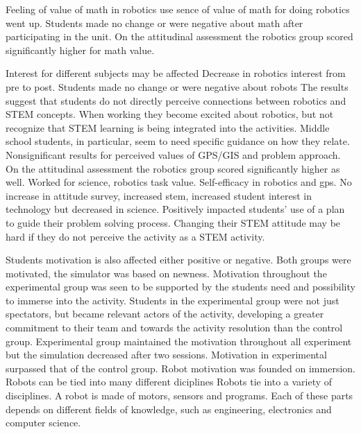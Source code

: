 \bigskip\noindent
Feeling of value of math in robotics use
\cite{silk2011resources} sence of value of math for doing robotics went up. 
\cite{silk2011resources}Students made no change or were negative about math after participating in the unit. 
\cite{nugent2009use} On the attitudinal assessment the robotics group scored significantly higher for math value.

\bigskip\noindent
Interest for different subjects may be affected
\cite{silk2011resources} Decrease in robotics interest from pre to post. 
\cite{silk2011resources} Students made no change or were negative about robots
\cite{nugent2008effect} The results suggest that students do not directly perceive connections between robotics and STEM concepts. When working they become excited about robotics, but not recognize that STEM learning is being integrated into the activities. Middle school students, in particular, seem to need specific guidance on how they relate. 
\cite{nugent2009use} Nonsignificant results for perceived values of GPS/GIS and problem approach.
\cite{nugent2009use}On the attitudinal assessment the robotics group scored significantly higher as well. Worked for science, robotics task value. Self-efficacy in robotics and gps. 
\cite{nugent2008effect} No increase in attitude survey, increased stem, increased student interest in technology but decreased in science. Positively impacted students’ use of a plan to guide their problem solving process. Changing their STEM attitude may be hard if they do not perceive the activity as a STEM activity.

\bigskip\noindent
Students motivation is also affected either positive or negative.
\cite{mitnik2009collaborative} Both groups were motivated, the simulator was based on newness. Motivation throughout the experimental group was seen to be supported by the students need and possibility to immerse into the activity. Students in the experimental group were not just spectators, but became relevant actors of the activity, developing a greater commitment to their team and towards the activity resolution than the control group. Experimental group maintained the motivation throughout all experiment but the simulation decreased after two sessions. 
\cite{mitnik2009collaborative}Motivation in experimental surpassed that of the control group. Robot motivation was founded on immersion.
Robots can be tied into many different diciplines
\cite{barker2007robotics} Robots tie into a variety of disciplines. A robot is made of motors, sensors and programs. Each of these parts depends on different fields of knowledge, such as engineering, electronics and computer science. 

